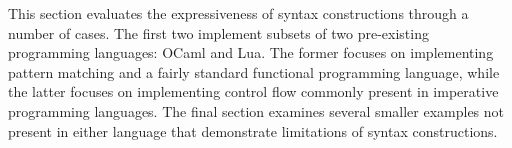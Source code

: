 \documentclass{kththesis}
\begin{document}
This section evaluates the expressiveness of syntax constructions through a number of cases. The first two implement subsets of two pre-existing programming languages: OCaml and Lua. The former focuses on implementing pattern matching and a fairly standard functional programming language, while the latter focuses on implementing control flow commonly present in imperative programming languages. The final section examines several smaller examples not present in either language that demonstrate limitations of syntax constructions.




\end{document}
